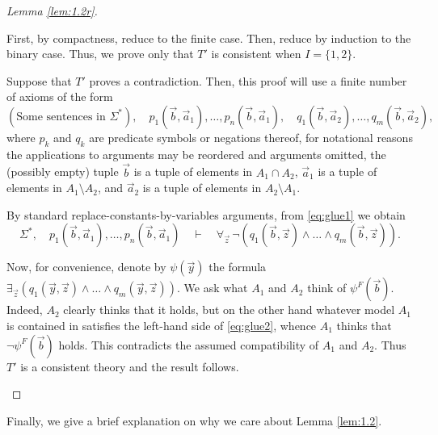 \documentclass{article}
\theoremstyle{nonumberplain}
\newtheorem{proof}{Proof}
\begin{document}
\begin{proof}[Lemma \ref{lem:1.2r}]
\begin{enumerate}
First, by compactness, reduce to the finite case. Then, reduce by induction to the binary case. Thus, we prove only that $T'$ is consistent when $I = \{1,2\}$.

Suppose that $T'$ proves a contradiction. Then, this proof will use a finite number of axioms of the form
\begin{equation}\label{eq:glue1}
(\text{Some sentences in $\Sigma^*$}),\quad p_1(\vec b, \vec a_1), \dots, p_n(\vec b, \vec a_1),\quad q_1(\vec b, \vec a_2), \dots, q_m(\vec b, \vec a_2),
\end{equation}
where $p_k$ and $q_k$ are predicate symbols or negations thereof, for notational reasons the applications to arguments may be reordered and arguments omitted, the (possibly empty) tuple $\vec b$ is a tuple of elements in $A_1 \cap A_2$, $\vec a_1$ is a tuple of elements in $A_1 \setminus A_2$, and $\vec a_2$ is a tuple of elements in $A_2 \setminus A_1$.

By standard replace-constants-by-variables arguments, from \eqref{eq:glue1} we obtain
\begin{equation}\label{eq:glue2}
\Sigma^*, \quad p_1(\vec b, \vec a_1), \dots, p_n(\vec b, \vec a_1) \quad \vdash \quad \forall_{\vec z} \,\neg(q_1(\vec b, \vec z) \land \dots \land q_m(\vec b, \vec z)).
\end{equation}

Now, for convenience, denote by $\psi(\vec y)$ the formula $\exists_{\vec z} (q_1(\vec y, \vec z) \land \dots \land q_m(\vec y, \vec z))$. We ask what $A_1$ and $A_2$ think of $\psi^F(\vec b)$. Indeed, $A_2$ clearly thinks that it holds, but on the other hand whatever model $A_1$ is contained in satisfies the left-hand side of \eqref{eq:glue2}, whence $A_1$ thinks that $\neg \psi^F(\vec b)$ holds. This contradicts the assumed compatibility of $A_1$ and $A_2$. Thus $T'$ is a consistent theory and the result follows.
\end{enumerate}
\end{proof}

Finally, we give a brief explanation on why we care about Lemma \ref{lem:1.2}.
\end{document}
